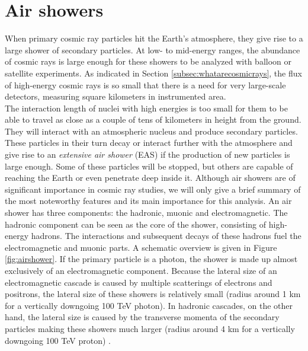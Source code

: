 \section{Air showers}
\label{sec:airshowers}
When primary cosmic ray particles hit the Earth's atmosphere, they give rise to a large shower of secondary particles. At low- to mid-energy ranges, the abundance of cosmic rays is large enough for these showers to be analyzed with balloon or satellite experiments. As indicated in Section \ref{subsec:whatarecosmicrays}, the flux of high-energy cosmic rays is so small that there is a need for very large-scale detectors, measuring square kilometers in instrumented area.\\
\newline
The interaction length of nuclei with high energies is too small for them to be able to travel as close as a couple of tens of kilometers in height from the ground. They will interact with an atmospheric nucleus and produce secondary particles.
These particles in their turn decay or interact further with the atmosphere and give rise to an \textit{extensive air shower} (EAS) if the production of new particles is large enough. Some of these particles will be stopped, but others are capable of reaching the Earth or even penetrate deep inside it. 
Although air showers are of significant importance in cosmic ray studies, we will only give a brief summary of the most noteworthy features and its main importance for this analysis.
An air shower has three components: the hadronic, muonic and electromagnetic. The hadronic component can be seen as the core of the shower, consisting of high-energy hadrons. The interactions and subsequent decays of these hadrons fuel the electromagnetic and muonic parts. A schematic overview is given in Figure \ref{fig:airshower}. If the primary particle is a photon, the shower is made up almost exclusively of an electromagnetic component. Because the lateral size of an electromagnetic cascade is caused by multiple scatterings of electrons and positrons, the lateral size of these showers is relatively small (radius around 1 km for a vertically downgoing 100 TeV photon). In hadronic cascades, on the other hand, the lateral size is caused by the transverse momenta of the secondary particles making these showers much larger (radius around 4 km for a vertically downgoing 100 TeV proton) \cite{Grupen:2005rx}.


